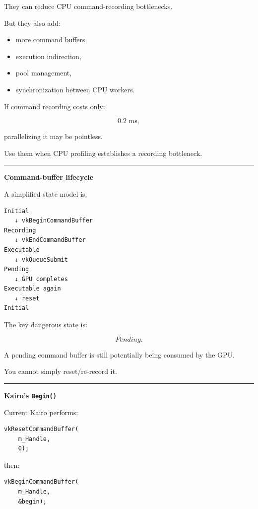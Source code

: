 They can reduce CPU command-recording bottlenecks.

But they also add:

\begin{itemize}
\tightlist
\item
  more command buffers,
\item
  execution indirection,
\item
  pool management,
\item
  synchronization between CPU workers.
\end{itemize}

If command recording costs only:

\[
0.2\text{ ms},
\]

parallelizing it may be pointless.

Use them when CPU profiling establishes a recording bottleneck.

\begin{center}\rule{0.5\linewidth}{0.5pt}\end{center}

\textbf{Command-buffer lifecycle}

A simplified state model is:

\begin{verbatim}
Initial
   ↓ vkBeginCommandBuffer
Recording
   ↓ vkEndCommandBuffer
Executable
   ↓ vkQueueSubmit
Pending
   ↓ GPU completes
Executable again
   ↓ reset
Initial
\end{verbatim}

The key dangerous state is:

\[
\boxed{Pending}.
\]

A pending command buffer is still potentially being consumed by the GPU.

You cannot simply reset/re-record it.

\begin{center}\rule{0.5\linewidth}{0.5pt}\end{center}

\textbf{Kairo's \texttt{Begin()}}

Current Kairo performs:

\begin{verbatim}
vkResetCommandBuffer(
    m_Handle,
    0);
\end{verbatim}

then:

\begin{verbatim}
vkBeginCommandBuffer(
    m_Handle,
    &begin);
\end{verbatim}

